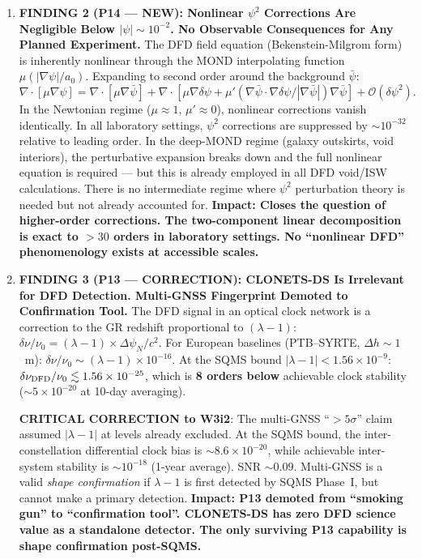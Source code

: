 \documentclass[11pt]{article}
\newcommand{\ee}[1]{\times 10^{#1}}
\begin{document}
\begin{tcolorbox}[colback=blue!5!white, colframe=blue!60!black,
  title=\textbf{W4i16 TOP 5 FINDINGS --- Ranked by Programme Impact}]
\begin{enumerate}
\item \textbf{FINDING 2 (P14 --- NEW): Nonlinear $\psi^2$ Corrections
  Are Negligible Below $|\psi| \sim 10^{-2}$. No Observable Consequences
  for Any Planned Experiment.}
  The DFD field equation (Bekenstein-Milgrom form) is inherently nonlinear
  through the MOND interpolating function $\mu(|\nabla\psi|/a_0)$. Expanding
  to second order around the background $\bar{\psi}$:
  \begin{equation}
    \nabla \cdot [\mu \nabla \psi] = \nabla \cdot [\mu \nabla \bar{\psi}]
    + \nabla \cdot [\mu \nabla \delta\psi + \mu' (\nabla\bar{\psi} \cdot
    \nabla\delta\psi / |\nabla\bar{\psi}|) \nabla\bar{\psi}]
    + \mathcal{O}(\delta\psi^2).
  \end{equation}
  In the Newtonian regime ($\mu \approx 1$, $\mu' \approx 0$), nonlinear
  corrections vanish identically. In all laboratory settings, $\psi^2$
  corrections are suppressed by $\sim 10^{-32}$ relative to leading order.
  In the deep-MOND regime (galaxy outskirts, void interiors), the
  perturbative expansion breaks down and the full nonlinear equation is
  required --- but this is already employed in all DFD void/ISW
  calculations. There is no intermediate regime where $\psi^2$
  perturbation theory is needed but not already accounted for.
  \textbf{Impact: Closes the question of higher-order corrections. The
  two-component linear decomposition is exact to $>30$ orders in
  laboratory settings. No ``nonlinear DFD'' phenomenology exists at
  accessible scales.}

\item \textbf{FINDING 3 (P13 --- CORRECTION): CLONETS-DS Is Irrelevant
  for DFD Detection. Multi-GNSS Fingerprint Demoted to Confirmation Tool.}
  The DFD signal in an optical clock network is a correction to the
  GR redshift proportional to $(\lambda-1)$:
  $\delta\nu/\nu_0 = (\lambda-1) \times \Delta\psi_N/c^2$.
  For European baselines (PTB--SYRTE, $\Delta h \sim 1$~m):
  $\delta\nu/\nu_0 \sim (\lambda-1) \times 10^{-16}$.
  At the SQMS bound $|\lambda-1| < 1.56\ee{-9}$:
  $\delta\nu_{\rm DFD}/\nu_0 \lesssim 1.56\ee{-25}$,
  which is \textbf{8 orders below} achievable clock stability
  ($\sim 5\ee{-20}$ at 10-day averaging).

  \textbf{CRITICAL CORRECTION to W3i2}: The multi-GNSS ``$>5\sigma$''
  claim assumed $|\lambda-1|$ at levels already excluded. At the
  SQMS bound, the inter-constellation differential clock bias is
  $\sim 8.6\ee{-20}$, while achievable inter-system stability is
  $\sim 10^{-18}$ (1-year average). SNR $\sim 0.09$.
  Multi-GNSS is a valid \emph{shape confirmation} if $\lambda-1$
  is first detected by SQMS Phase~I, but cannot make a primary detection.
  \textbf{Impact: P13 demoted from ``smoking gun'' to ``confirmation
  tool''. CLONETS-DS has zero DFD science value as a standalone detector.
  The only surviving P13 capability is shape confirmation post-SQMS.}


\end{enumerate}
\end{tcolorbox}
\end{document}
